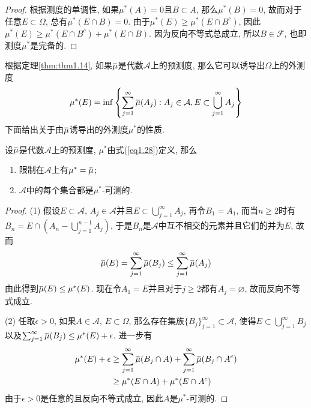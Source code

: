 \documentclass[cn, 12pt, math=mtpro2, bibstyle=apa, blue, twocol]{elegantbook}
\newcommand{\F}{\mathcal{F}}
\newcommand{\overbar}[1]{\mkern 1.5mu\overline{\mkern-1.5mu#1\mkern-1.5mu}\mkern 1.5mu}
\let\emptyset\varnothing
\begin{document}
\begin{proof}
  根据测度的单调性, 如果$\mu^\ast(A)=0$且$B\subset A$, 那么$\mu^\ast(B)=0$, 故而对于任意$E\subset\Omega$, 总有$\mu^\ast(E\cap B)=0$. 由于$\mu^\ast(E)\geq\mu^\ast(E\cap B^c)$, 因此$\mu^\ast(E)\geq \mu^\ast(E\cap B^c)+\mu^\ast(E\cap B)$. 因为反向不等式总成立, 所以$B\in\F$, 也即测度$\mu^\ast$是完备的.
\end{proof}

根据定理\ref{thm:thm1.14}, 如果$\overbar{\mu}$是代数$\mathcal{A}$上的预测度, 那么它可以诱导出$\Omega$上的外测度
\begin{equation}\label{eq1.28}
  \mu^\ast(E)=\inf\left\{\sum_{j=1}^{\infty}\overbar{\mu}(A_j): A_j\in\mathcal{A}, E\subset\bigcup_{j=1}^\infty A_j\right\}
\end{equation}
下面给出关于由$\overbar{\mu}$诱导出的外测度$\mu^\ast$的性质.

\begin{theorem}\label{thm:thm1.16}
  设$\overbar{\mu}$是代数$\mathcal{A}$上的预测度, $\mu^\ast$由式(\ref{eq1.28})定义, 那么
  \begin{enumerate}[label=(\arabic*)]
    \item 限制在$\mathcal{A}$上有$\mu^\ast=\overbar{\mu}$;
    \item $\mathcal{A}$中的每个集合都是$\mu^\ast$-可测的.
  \end{enumerate}
\end{theorem}
\begin{proof}
  (1) 假设$E\subset\mathcal{A}$, $A_j\in\mathcal{A}$并且$E\subset\bigcup_{j=1}^\infty A_j$, 再令$B_1=A_1$, 而当$n\ge2$时有$B_n=E\cap (A_n-\bigcup_{j=1}^{n-1}A_j)$, 于是$B_n$是$\mathcal{A}$中互不相交的元素并且它们的并为$E$, 故而
  $$\overbar{\mu}(E)=\sum_{j=1}^{\infty}\overbar{\mu}(B_j)\leq\sum_{j=1}^{\infty}\overbar{\mu}(A_j)$$
  由此得到$\overbar{\mu}(E)\leq \mu^\ast(E)$. 现在令$A_1=E$并且对于$j\ge2$都有$A_j=\emptyset$, 故而反向不等式成立.

  (2) 任取$\epsilon>0$, 如果$A\in\mathcal{A}$, $E\subset\Omega$, 那么存在集族$\{B_j\}_{j=1}^\infty\subset\mathcal{A}$, 使得$E\subset\bigcup_{j=1}^\infty B_j$以及$\sum_{j=1}^{\infty}\overbar{\mu}(B_j)\leq \mu^\ast(E)+\epsilon$. 进一步有
  \begin{align*}
  \mu^\ast(E)+\epsilon&\geq \sum_{j=1}^{\infty}\overbar{\mu}(B_j\cap A)+\sum_{j=1}^{\infty}\overbar{\mu}(B_j\cap A^c) \\
  &\geq \mu^\ast(E\cap A)+\mu^\ast(E\cap A^c)
  \end{align*}
  由于$\epsilon>0$是任意的且反向不等式成立, 因此$A$是$\mu^\ast$-可测的.
\end{proof}
\end{document}
